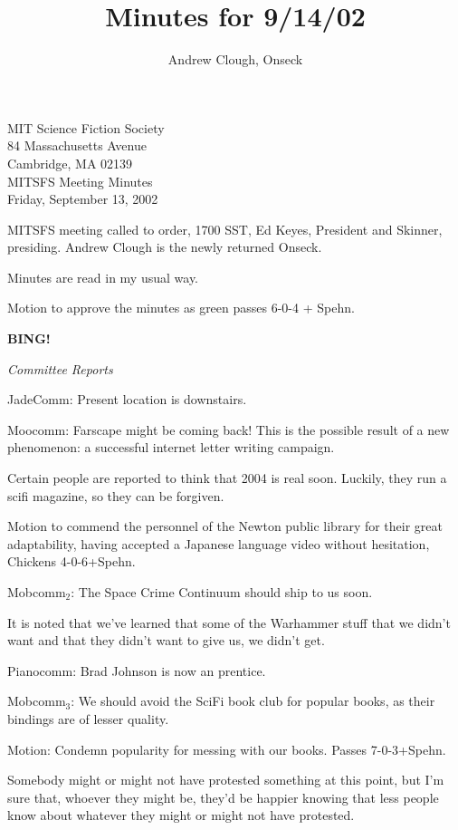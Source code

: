 \documentclass{article}
\title{Minutes for 9/14/02}
\author{Andrew Clough, Onseck}
\begin{document}
\begin{center}
MIT Science Fiction Society\\
84 Massachusetts Avenue\\
Cambridge, MA 02139\\

MITSFS Meeting Minutes\\
Friday, September 13, 2002\\

\end{center}

MITSFS meeting called to order, 1700 SST, Ed Keyes, President and Skinner, presiding.  Andrew Clough is the newly returned Onseck.

Minutes are read in my usual way.

Motion to approve the minutes as green passes 6-0-4 + Spehn.

\textbf{BING!}

\begin{center}
\textit{Committee Reports}
\end{center}

JadeComm: Present location is downstairs.

Moocomm:  Farscape might be coming back!  This is the possible result of a new phenomenon: a successful internet letter writing campaign.

Certain people are reported to think that 2004 is real soon.  Luckily, they run a scifi magazine, so they can be forgiven.  

Motion to commend the personnel of the Newton public library for their great adaptability, having accepted a Japanese language video without hesitation, Chickens 4-0-6+Spehn.

Mobcomm$_2$:  The Space Crime Continuum should ship to us soon.

It is noted that we've learned that some of the Warhammer stuff that we didn't want and that they didn't want to give us, we didn't get.

Pianocomm:  Brad Johnson is now an prentice.

Mobcomm$_3$:  We should avoid the SciFi book club for popular books, as their bindings are of lesser quality.

Motion: Condemn popularity for messing with our books.  Passes 7-0-3+Spehn.

Somebody might or might not have protested something at this point, but I'm sure that, whoever they might be, they'd be happier knowing that less people know about whatever they might or might not have protested.
\end{document}
